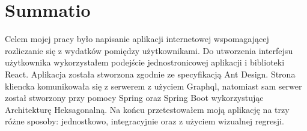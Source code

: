 \documentclass[
    left=2.5cm,         %
    right=2.5cm,        %
    top=2.5cm,          %
    bottom=3cm,         %
    bindingoffset=6mm,  %
    nohyphenation=false %
]{eiti/eiti-thesis}
\begin{document}


\clearpage %
\section{Summatio}          %
Celem mojej pracy było napisanie aplikacji internetowej wspomagającej rozliczanie się z wydatków pomiędzy użytkownikami. Do utworzenia interfejsu użytkownika wykorzystałem podejście jednostronicowej aplikacji i biblioteki React. Aplikacja została stworzona zgodnie ze specyfikacją Ant Design. Strona kliencka komunikowała się z serwerem z użyciem Graphql, natomiast sam serwer został stworzony przy pomocy Spring oraz Spring Boot wykorzystując Architekturę Heksagonalną. Na końcu przetestowałem moją aplikację na trzy różne sposoby: jednostkowo, integracyjnie oraz z użyciem wizualnej regresji.

\cleardoublepage %
\printbibliography


\newpage
\pagestyle{plain}

\vspace{0.8cm}

\listoffigurestoc     %
\vspace{1cm}          %

\end{document}

